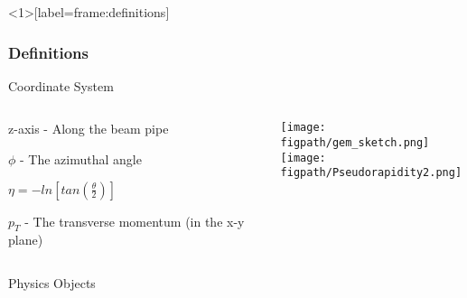 \begin{frame}<1>[label=frame:definitions]
    \frametitle{Definitions}
    \vspace*{-0.24cm}
    \begin{block}{Coordinate System}
        \begin{columns}[T]
                \begin{itemize}
                    \scriptsize{
                      \item z-axis - Along the beam pipe
                      \item $\phi$ - The azimuthal angle
                      \item $\eta=-ln[tan(\frac{\theta}{2})]$
                      \item $p_{T}$ - The transverse momentum (in the x-y plane)
                    }
                \end{itemize}
                \texttt{[image: \\figpath/gem\_sketch.png]}
                \texttt{[image: \\figpath/Pseudorapidity2.png]}
        \end{columns}
    \end{block}
    \vspace*{-0.16cm}
    \begin{block}{Physics Objects}
        \begin{columns}[T]
                \begin{itemize}
                    \scriptsize{
                        }
\end{itemize}
\end{columns}
\end{block}
\end{frame}
